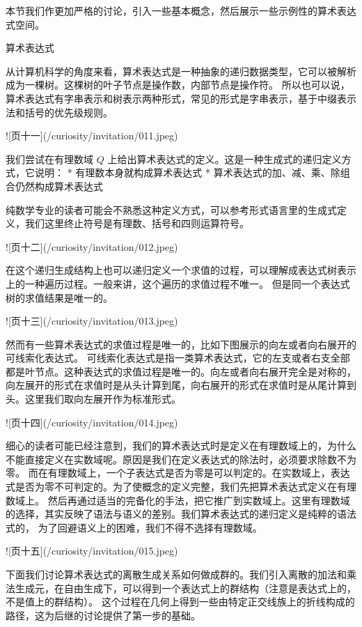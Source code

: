 \documentclass[a4paper,12pt]{book}
\numberwithin{problem}{section}
\numberwithin{definition}{section}
\numberwithin{lemma}{section}
\numberwithin{proposition}{section}
\numberwithin{theorem}{section}
\numberwithin{grammar}{section}
\numberwithin{program}{section}
\numberwithin{convention}{section}
\numberwithin{corollary}{section}
\begin{document}
本节我们作更加严格的讨论，引入一些基本概念，然后展示一些示例性的算术表达式空间。

算术表达式

从计算机科学的角度来看，算术表达式是一种抽象的递归数据类型，它可以被解析成为一棵树。这棵树的叶子节点是操作数，内部节点是操作符。
所以也可以说，算术表达式有字串表示和树表示两种形式，常见的形式是字串表示，基于中缀表示法和括号的优先级规则。

![页十一](/curiosity/invitation/011.jpeg)

我们尝试在有理数域 $Q$ 上给出算术表达式的定义。这是一种生成式的递归定义方式，它说明：
* 有理数本身就构成算术表达式
* 算术表达式的加、减、乘、除组合仍然构成算术表达式

纯数学专业的读者可能会不熟悉这种定义方式，可以参考形式语言里的生成式定义，我们这里终止符号是有理数、括号和四则运算符号。

![页十二](/curiosity/invitation/012.jpeg)

在这个递归生成结构上也可以递归定义一个求值的过程，可以理解成表达式树表示上的一种遍历过程。一般来讲，这个遍历的求值过程不唯一。
但是同一个表达式树的求值结果是唯一的。

![页十三](/curiosity/invitation/013.jpeg)

然而有一些算术表达式的求值过程是唯一的，比如下图展示的向左或者向右展开的可线索化表达式。
可线索化表达式是指一类算术表达式，它的左支或者右支全部都是叶节点。这种表达式的求值过程是唯一的。向左或者向右展开完全是对称的，
向左展开的形式在求值时是从头计算到尾，向右展开的形式在求值时是从尾计算到头。这里我们取向左展开作为标准形式。

![页十四](/curiosity/invitation/014.jpeg)

细心的读者可能已经注意到，我们的算术表达式时是定义在有理数域上的，为什么不能直接定义在实数域呢。原因是我们在定义表达式的除法时，必须要求除数不为零。
而在有理数域上，一个子表达式是否为零是可以判定的。在实数域上，表达式是否为零不可判定的。为了使概念的定义完整，我们先把算术表达式定义在有理数域上。
然后再通过适当的完备化的手法，把它推广到实数域上。这里有理数域的选择，其实反映了语法与语义的差别。我们算术表达式的递归定义是纯粹的语法式的，
为了回避语义上的困难，我们不得不选择有理数域。

![页十五](/curiosity/invitation/015.jpeg)

下面我们讨论算术表达式的离散生成关系如何做成群的。我们引入离散的加法和乘法生成元，在自由生成下，可以得到一个表达式上的群结构（注意是表达式上的，不是值上的群结构）。
这个过程在几何上得到一些由特定正交线族上的折线构成的路径，这为后继的讨论提供了第一步的基础。
\end{document}
